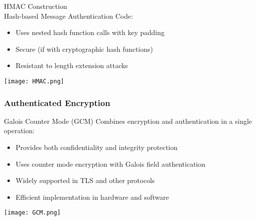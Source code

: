 \begin{concept}{HMAC Construction}\\
    Hash-based Message Authentication Code:

    \begin{itemize}
        \item Uses nested hash function calls with key padding
        \item Secure (if with cryptographic hash functions)
        \item Resistant to length extension attacks
    \end{itemize}
    \texttt{[image: HMAC.png]}
\end{concept}

\multend





\subsubsection{Authenticated Encryption}

\begin{concept}{Galois Counter Mode (GCM)}
    Combines encryption and authentication in a single operation:
    \begin{itemize}
        \item Provides both confidentiality and integrity protection
        \item Uses counter mode encryption with Galois field authentication
        \item Widely supported in TLS and other protocols
        \item Efficient implementation in hardware and software
    \end{itemize}
    \texttt{[image: GCM.png]}
\end{concept}


